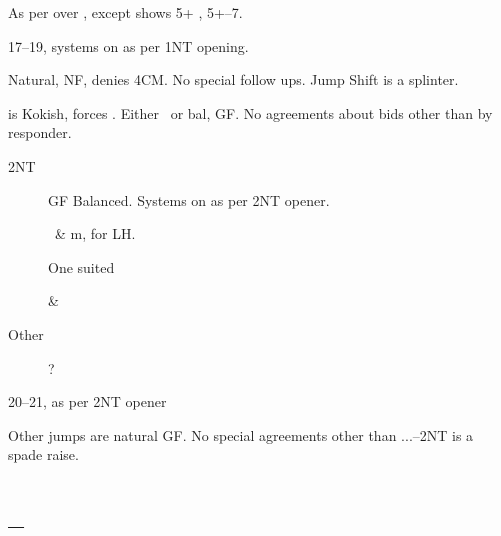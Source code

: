\documentclass[tom-ari]{subfile}
\begin{document}
	
	As per over , except  shows 5+ \heartsuit, 5+--7.
	
	
	17--19, systems on as per 1NT opening.
	
	
	Natural, NF, denies 4CM.  No special follow ups. Jump Shift is a splinter.
	
	
	 is Kokish, forces .  Either \heartsuit ~or bal, GF.  No agreements about bids other than  by responder.
	
	\begin{description}
		\item[2NT] GF Balanced.  Systems on as per 2NT opener.
		\item[] \heartsuit ~\& m,  for LH.
		\item[] One suited \heartsuit
		\item[] \heartsuit \& ~\spadesuit
		\item[Other] ?
	\end{description} 

	
	20--21, as per 2NT opener
	
	
	Other jumps are natural GF.  No special agreements other than ...--2NT is a spade raise.
	
	\section[1C--1H]{--}
 
\end{document}
